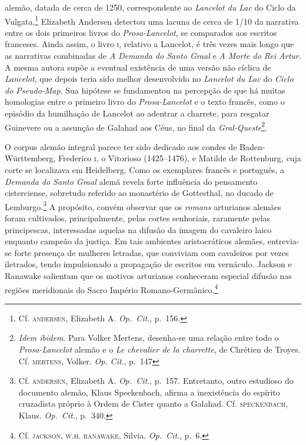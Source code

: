 alemão, datada de cerca de 1250, correspondente ao \textit{Lancelot du
Lac} do Ciclo da Vulgata.\footnote{ Cf. \textsc{andersen}, Elizabeth A.
\textit{Op.~Cit}., p.~156.} Elizabeth Andersen detectou uma lacuna de
cerca de 1/10 da narrativa entre os dois primeiros livros do
\textit{Prosa-Lancelot}, se comparados aos escritos franceses. Ainda
assim, o livro \textsc{i}, relativo a Lancelot, é três vezes mais longo que as
narrativas combinadas de \textit{A Demanda do Santo Graal} e \textit{A
Morte do Rei Artur}. A mesma autora supõe a eventual existência de uma
versão não cíclica de \textit{Lancelot}, que depois teria sido melhor
desenvolvido no \textit{Lancelot du Lac} do \textit{Ciclo do
Pseudo-Map}. Sua hipótese se fundamentou na percepção de que há muitas
homologias entre o primeiro livro do \textit{Prosa-Lancelot} e o texto
francês, como o episódio da humilhação de Lancelot ao adentrar a
charrete, para resgatar Guinevere ou a assunção de Galahad aos Céus, no
final da \textit{Gral-Queste}\footnote{ \textit{Idem ibidem}. Para
Volker Mertens, desenha-se uma relação entre todo o
\textit{Prosa-Lancelot} alemão e o \textit{Le chevalier de la
charrette}, de Chrétien de Troyes. Cf. \textsc{mertens}, Volker. \textit{Op.
Cit}., p.~147}. 

O corpus alemão integral parece ter sido dedicado aos condes de
Baden-Württemberg, Frederico \textsc{i}, o Vitorioso (1425--1476), e Matilde de
Rottenburg, cuja corte se localizava em Heidelberg. Como os exemplares
francês e português, a \textit{Demanda do Santo Graal} alemã revela
forte influência do pensamento cisterciense, sobretudo referido ao
monastério de Gottesthal, no ducado de Lemburgo.\footnote{ Cf. \textsc{andersen},
Elizabeth A. \textit{Op.~Cit}., p.~157. Entretanto, outro estudioso do
documento alemão, Klaus Speckenbach, afirma a inexistência do espírito
cruzadista próprio à Ordem de Cister quanto a Galahad. Cf. \textsc{speckenbach},
Klaus. \textit{Op.~Cit}., p.~340.} A propósito, convém observar que
os \textit{romans} arturianos alemães foram cultivados, principalmente,
pelas cortes senhoriais, raramente pelas principescas, interessadas
aquelas na difusão da imagem do cavaleiro laico enquanto campeão da
justiça. Em tais ambientes aristocráticos alemães, entrevia-se forte
presença de mulheres letradas, que conviviam com cavaleiros por vezes
iletrados, tendo impulsionado a propagação de escritos em vernáculo.
Jackson e Ranawake salientam que os motivos arturianos conheceram
especial difusão nas regiões meridionais do Sacro Império
Romano-Germânico.\footnote{ Cf. \textsc{jackson}, \textsc{w.h. ranawake}, Silvia.
\textit{Op.~Cit}., p.~6.} 

